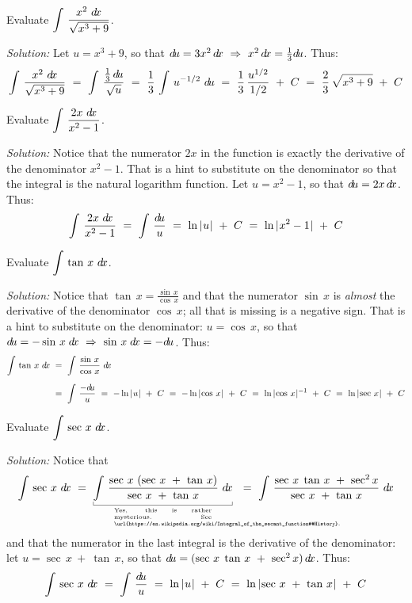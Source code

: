 \divider
\newpage
\begin{exmp}\label{exmp:subst6}
\noindent Evaluate $\displaystyle\int\,\dfrac{x^2~d\!x}{\sqrt{x^3 + 9}}$.\vspace{1mm}
\par\noindent\emph{Solution:} Let $u = x^3 + 9$, so that $d\!u = 3x^2\,d\!x
~\Rightarrow~ x^2\,d\!x = \frac{1}{3}d\!u$. Thus:
\[
\int\,\dfrac{x^2~d\!x}{\sqrt{x^3 + 9}} ~=~ \int\,\dfrac{\frac{1}{3}\,d\!u}{\sqrt{u}} ~=~ 
\frac{1}{3}\,\int\,u^{-1/2}~d\!u ~=~ \frac{1}{3}\,\frac{u^{1/2}}{1/2} ~+~ C ~=~
\frac{2}{3}\,\sqrt{x^3 + 9} ~+~ C
\]
\end{exmp}
\begin{exmp}\label{exmp:subst7}
\noindent Evaluate $\displaystyle\int\,\dfrac{2x~d\!x}{x^2 - 1}$.\vspace{1mm}
\par\noindent\emph{Solution:} Notice that the numerator $2x$ in the function is
exactly the derivative of the denominator $x^2 - 1$. That is a hint to
substitute on the denominator so that the integral is the natural logarithm
function. Let $u = x^2 - 1$, so that $d\!u = 2x\,d\!x$. Thus:
\[
\int\,\dfrac{2x~d\!x}{x^2 - 1} ~=~ \int\,\dfrac{d\!u}{u} ~=~ \ln\,\lvert\mspace{1mu}u\mspace{1mu}\rvert ~+~ C
~=~ \ln\,\lvert\mspace{1mu}x^2 - 1\mspace{1mu}\rvert ~+~ C
\]
\end{exmp}
\begin{exmp}\label{exmp:subst8}
\noindent Evaluate $\displaystyle\int\,\tan\,x~d\!x$.\vspace{1mm}
\par\noindent\emph{Solution:} Notice that $\tan\,x = \frac{\sin\,x}{\cos\,x}$
and that the numerator $\sin\,x$ is \emph{almost} the derivative of the
denominator $\cos\,x$; all that is missing is a negative sign. That is a hint to
substitute on the denominator: $u = \cos\,x$, so that
$d\!u = -\sin\,x\;d\!x ~\Rightarrow~ \sin\,x\;d\!x = -d\!u$. Thus:
\begin{align*}
\int\,\tan\,x~d\!x ~&=~ \int\,\frac{\sin\,x}{\cos\,x}~d\!x\\[6pt]
&=~
\int\,\frac{-d\!u}{u} ~=~ -\ln\,\lvert\mspace{1mu}u\mspace{1mu}\rvert ~+~ C ~=~ -\ln\,\lvert\mspace{1mu}\cos\,x\mspace{1mu}\rvert ~+~ C
~=~ \ln\,\lvert\mspace{1mu}\cos\,x\mspace{1mu}\rvert^{-1} ~+~ C ~=~ \ln\,\lvert\mspace{1mu}\sec\,x\mspace{1mu}\rvert ~+~ C
\end{align*}
\end{exmp}
\begin{exmp}\label{exmp:subst9}
\noindent Evaluate $\displaystyle\int\,\sec\,x~d\!x$.\vspace{1mm}
\par\noindent\emph{Solution:} Notice that
\[
\int\,\sec\,x~\dx ~=~ \underbracket[0.3pt]{\int\,\frac{\sec\,x~(\sec\,x ~+~ \tan\,x)}{\sec\,x ~+~ \tan\,x}~\dx}
_{\begin{minipage}[t]{0.255\linewidth}
    \tiny
    Yes, this is rather mysterious. See \url{https://en.wikipedia.org/wiki/Integral_of_the_secant_function#History}.
\end{minipage}}
~
~=~ \int\,\frac{\sec\,x\;\tan\,x ~+~ \sec^2 x}{\sec\,x ~+~ \tan\,x}~\dx
\]
and that the numerator in the last integral is the derivative of the
denominator: let $u = \sec\,x ~+~ \tan\,x$, so that
$d\!u = (\sec\,x\;\tan\,x ~+~ \sec^2 x)\,d\!x$. Thus:
\[
\int\,\sec\,x~d\!x ~=~ \int\,\frac{d\!u}{u} ~=~ \ln\,\lvert\mspace{1mu}u\mspace{1mu}\rvert ~+~ C ~=~
\ln\,\lvert\mspace{1mu}\sec\,x ~+~ \tan\,x\mspace{1mu}\rvert ~+~ C
\]
\end{exmp}
